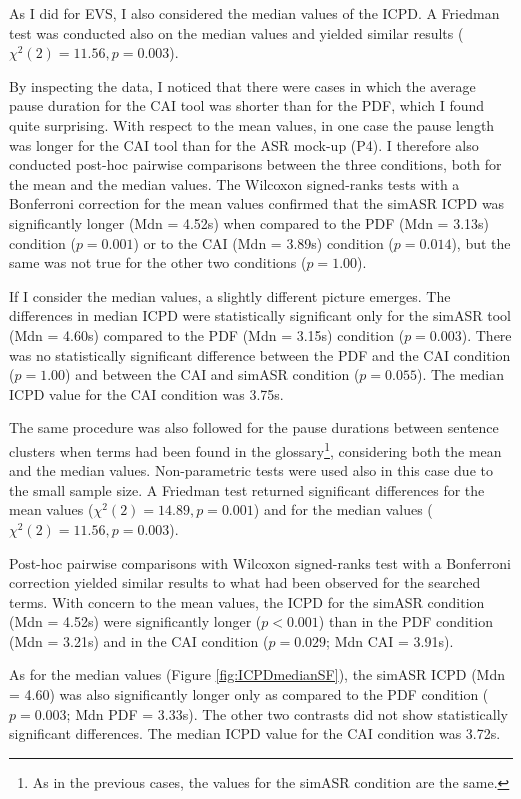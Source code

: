 As I did for EVS, I also considered the median values of the ICPD. A Friedman test was conducted also on the median values and yielded similar results ($\chi^2(2) = 11.56, p = 0.003$).

By inspecting the data, I noticed that there were cases in which the average pause duration for the CAI tool was shorter than for the PDF, which I found quite surprising. With respect to the mean values, in one case the pause length was longer for the CAI tool than for the ASR mock-up (P4). I therefore also conducted post-hoc pairwise comparisons between the three conditions, both for the mean and the median values. The Wilcoxon signed-ranks tests with a Bonferroni correction for the mean values confirmed that the simASR ICPD was significantly longer (Mdn = 4.52s) when compared to the PDF (Mdn = 3.13s) condition ($p = 0.001$) or to the CAI (Mdn = 3.89s) condition ($p = 0.014$), but the same was not true for the other two conditions ($p = 1.00$).

If I consider the median values, a slightly different picture emerges. The differences in median ICPD were statistically significant only for the simASR tool (Mdn = 4.60s) compared to the PDF (Mdn = 3.15s) condition ($p = 0.003$). There was no statistically significant difference between the PDF and the CAI condition ($p = 1.00$) and between the CAI and simASR condition ($p = 0.055$). The median ICPD value for the CAI condition was 3.75s.

The same procedure was also followed for the pause durations between sentence clusters when terms had been found in the glossary\footnote{As in the previous cases, the values for the simASR condition are the same.}, considering both the mean and the median values. Non-parametric tests were used also in this case due to the small sample size. A Friedman test returned significant differences for the mean values ($\chi^2(2) = 14.89, p = 0.001$) and for the median values ($\chi^2(2) = 11.56, p = 0.003$).

\begin{sloppypar}
Post-hoc pairwise comparisons with Wilcoxon signed-ranks test with a Bonferroni correction yielded similar results to what had been observed for the searched terms. With concern to the mean values, the ICPD for the simASR condition (Mdn = 4.52s) were significantly longer ($p < 0.001$) than in the PDF condition (Mdn = 3.21s) and in the CAI condition ($p = 0.029$; Mdn CAI = 3.91s).
\end{sloppypar}

As for the median values (Figure \ref{fig:ICPDmedianSF}), the simASR ICPD (Mdn = 4.60) was also significantly longer only as compared to the PDF condition ($p = 0.003$; Mdn PDF = 3.33s). The other two contrasts did not show statistically significant differences. The median ICPD value for the CAI condition was 3.72s.

